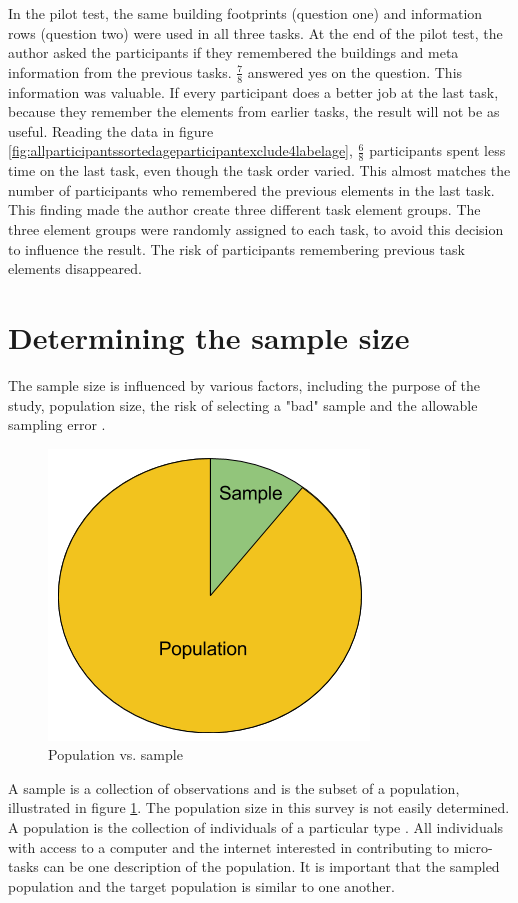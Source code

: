 In the pilot test, the same building footprints (question one) and information rows (question two) were used in all three tasks. At the end of the pilot test, the author asked the participants if they remembered the buildings and meta information from the previous tasks. $\frac{7}{8}$ answered yes on the question. This information was valuable. If every participant does a better job at the last task, because they remember the elements from earlier tasks, the result will not be as useful. Reading the data in figure \ref{fig:allparticipantssortedageparticipantexclude4labelage}, $\frac{6}{8}$ participants spent less time on the last task, even though the task order varied. This almost matches the number of participants who remembered the previous elements in the last task. This finding made the author create three different task element groups. The three element groups were randomly assigned to each task, to avoid this decision to influence the result. The risk of participants remembering previous task elements disappeared.

\section[Sample Size]{Determining the sample size}
The sample size is influenced by various factors, including the purpose of the study, population size, the risk of selecting a "bad" sample and the allowable sampling error \citep{Israel1992}. 

\begin{figure}[h]
	\centering
	\includegraphics[width=0.35\linewidth]{fig/popsample}
	\caption{Population vs. sample}
	\label{fig:popsample}
\end{figure}

A sample is a collection of observations and is the subset of a population, illustrated in figure \ref{fig:popsample}. The population size in this survey is not easily determined. A population is the collection of individuals of a particular type \citep{Walpole2012}. All individuals with access to a computer and the internet interested in contributing to micro-tasks can be one description of the population. It is important that the sampled population and the target population is similar to one another.

